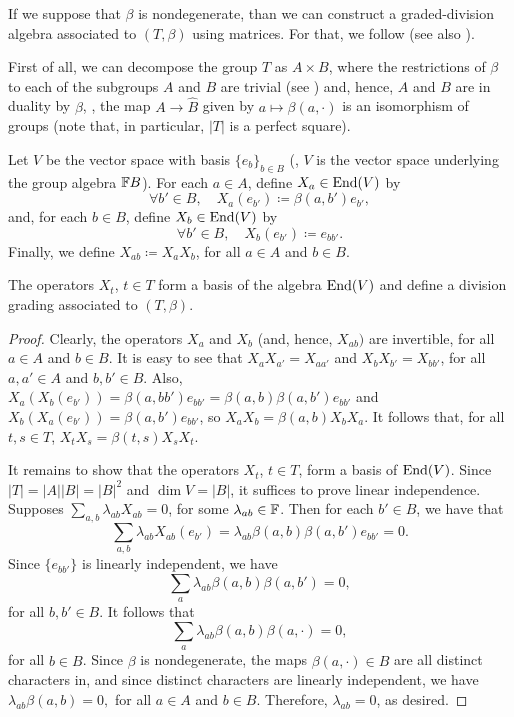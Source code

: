 If we suppose that $\beta$ is nondegenerate, than we can construct a graded-division algebra associated to $(T,\beta)$ using matrices. 
For that, we follow \cite[Remark 18]{EK15} (see also \cite[Remark 2.16]{livromicha}).

First of all, we can decompose the group $T$ as $A\times B$, where the restrictions of $\beta$ to each of the subgroups $A$ and $B$ are trivial (see \cite[page 36]{livromicha}) and, hence, $A$ and $B$ are in duality by $\beta$, \ie, the map $A \to \widehat B$ given by $a \mapsto \beta(a, \cdot)$ is an isomorphism of groups (note that, in particular, $|T|$ is a perfect square). 

Let $V$ be the vector space with basis $\{e_b\}_{b\in B}$ (\ie, $V$ is the vector space underlying the group algebra $\mathbb{F} B$). 
For each $a\in A$, define $X_a\in \operatorname{End}(V)$ by
\[
    \forall b' \in B, \quad X_a (e_{b'}) \coloneqq \beta(a, b')e_{b'},
\]
and, for each $b\in B$, define $X_b\in \operatorname{End}(V)$ by
\[
    \forall b' \in B, \quad X_b (e_{b'}) \coloneqq e_{bb'}.
\]
Finally, we define $X_{ab} \coloneqq X_a X_b$, for all $a\in A$ and $b\in B$. 

\begin{prop}\label{prop:X_t-is-basis}
    The operators $X_t$, $t\in T$ form a basis of the algebra $\operatorname{End}(V)$ and define a division grading associated to $(T, \beta)$. 
\end{prop}

\begin{proof}
    Clearly, the operators $X_a$ and $X_b$ (and, hence, $X_{ab})$ are invertible, for all $a\in A$ and $b\in B$. 
    It is easy to see that $X_a X_{a'} = X_{aa'}$ and $X_{b} X_{b'} = X_{bb'}$, for all $a, a' \in A$ and $b, b'\in B$. 
    Also, $X_a ( X_b(e_{b'}) ) = \beta(a, bb') e_{bb'} = \beta(a, b) \beta(a,b') e_{bb'}$ and $X_b ( X_a(e_{b'}) ) = \beta(a, b') e_{bb'}$, so $X_a X_b = \beta(a,b) X_b X_a$. 
    It follows that, for all $t,s \in T$, $X_t X_s = \beta(t,s) X_s X_t$.

    It remains to show that the operators $X_t$, $t\in T$, form a basis of $\operatorname{End}(V)$. 
    Since $|T| = |A||B| = |B|^2$ and $\dim V = |B|$, it suffices to prove linear independence. 
    Supposes $\sum_{a,b} \lambda_{ab} X_{ab} = 0$, for some $\lambda_{ab} \in \mathbb{F}$. 
    Then for each $b' \in B$, we have that
    \[
        \sum_{a,b} \lambda_{ab} X_{ab} (e_{b'}) = \lambda_{ab} \beta(a, b) \beta(a,b') e_{bb'} = 0.
    \]
    Since $\{ e_{bb'} \}$ is linearly independent, we have
    \[
        \sum_a \lambda_{ab} \beta(a, b) \beta(a,b') = 0,
    \]
    for all $b,b' \in B$. 
    It follows that
    \[
        \sum_a \lambda_{ab} \beta(a, b) \beta(a, \cdot) = 0,
    \]
    for all $b\in B$. 
    Since $\beta$ is nondegenerate, the maps $\beta(a, \cdot) \in \widehat B$ are all distinct characters in, and since distinct characters are linearly independent, we have
    $
        \lambda_{ab} \beta(a, b) = 0,
    $
    for all $a\in A$ and $b\in B$. 
    Therefore, $\lambda_{ab} = 0$, as desired. 
\end{proof}

